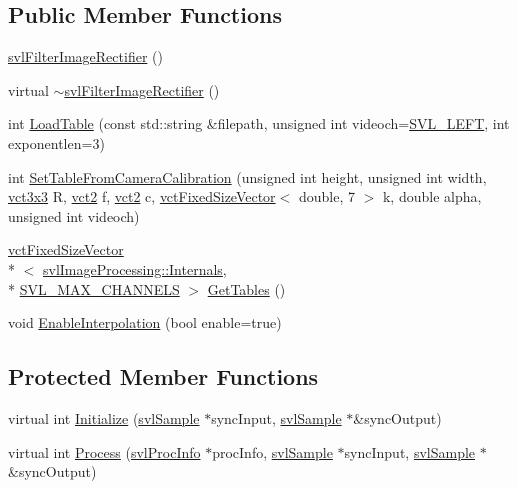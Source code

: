 \subsection*{Public Member Functions}
\begin{DoxyCompactItemize}
\item 
\hyperlink{classsvl_filter_image_rectifier_a635a7336fbc13c83da32005df7dc3204}{svl\-Filter\-Image\-Rectifier} ()
\item 
virtual \hyperlink{classsvl_filter_image_rectifier_ae1cd3da5b7b5e1c1386dbc3ef37a51c3}{$\sim$svl\-Filter\-Image\-Rectifier} ()
\item 
int \hyperlink{classsvl_filter_image_rectifier_a76d556231102310b84f15516fd6284f0}{Load\-Table} (const std\-::string \&filepath, unsigned int videoch=\hyperlink{svl_definitions_8h_ab9fec7615f19c8df2919eebcab0b187f}{S\-V\-L\-\_\-\-L\-E\-F\-T}, int exponentlen=3)
\item 
int \hyperlink{classsvl_filter_image_rectifier_a66fac44ec059b58fcff75f9199610075}{Set\-Table\-From\-Camera\-Calibration} (unsigned int height, unsigned int width, \hyperlink{vct_fixed_size_matrix_types_8h_aac4a419dacf9282410675d42ebc86a7c}{vct3x3} R, \hyperlink{vct_fixed_size_vector_types_8h_a88481ac3c794867ba5e4e92624f0d958}{vct2} f, \hyperlink{vct_fixed_size_vector_types_8h_a88481ac3c794867ba5e4e92624f0d958}{vct2} c, \hyperlink{classvct_fixed_size_vector}{vct\-Fixed\-Size\-Vector}$<$ double, 7 $>$ k, double alpha, unsigned int videoch)
\item 
\hyperlink{classvct_fixed_size_vector}{vct\-Fixed\-Size\-Vector}\\*
$<$ \hyperlink{classsvl_image_processing_1_1_internals}{svl\-Image\-Processing\-::\-Internals}, \\*
\hyperlink{svl_definitions_8h_aa33455b98ecb4e82d81ebcb7e87f3c01}{S\-V\-L\-\_\-\-M\-A\-X\-\_\-\-C\-H\-A\-N\-N\-E\-L\-S} $>$ \hyperlink{classsvl_filter_image_rectifier_a7c3793303f463aca87c1140099fcdafc}{Get\-Tables} ()
\item 
void \hyperlink{classsvl_filter_image_rectifier_a14166cfe052c64b365af6d63a343f8bc}{Enable\-Interpolation} (bool enable=true)
\end{DoxyCompactItemize}
\subsection*{Protected Member Functions}
\begin{DoxyCompactItemize}
\item 
virtual int \hyperlink{classsvl_filter_image_rectifier_a33e7cf150398b3a7448a6147b7130ff3}{Initialize} (\hyperlink{classsvl_sample}{svl\-Sample} $\ast$sync\-Input, \hyperlink{classsvl_sample}{svl\-Sample} $\ast$\&sync\-Output)
\item 
virtual int \hyperlink{classsvl_filter_image_rectifier_ac1b25ed9782f75d8a6011d18152843f6}{Process} (\hyperlink{structsvl_proc_info}{svl\-Proc\-Info} $\ast$proc\-Info, \hyperlink{classsvl_sample}{svl\-Sample} $\ast$sync\-Input, \hyperlink{classsvl_sample}{svl\-Sample} $\ast$\&sync\-Output)
\end{DoxyCompactItemize}
